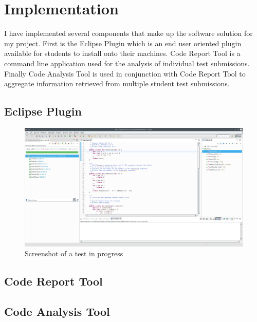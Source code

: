 \documentclass[twocolumn]{article}
\begin{document}
\section{Implementation}

I have implemented several components that make up the software solution for my
project. First is the Eclipse Plugin which is an end user oriented plugin
available for students to install onto their machines. Code Report Tool is a
command line application used for the analysis of individual test submissions.
Finally Code Analysis Tool is used in conjunction with Code Report Tool to
aggregate information retrieved from multiple student test submissions.

\subsection{Eclipse Plugin}

\begin{figure}[h!]
\centering
\includegraphics[width=\linewidth]{figures/eclipse}
\caption{Screenshot of a test in progress}
\end{figure}

\subsection{Code Report Tool}
\subsection{Code Analysis Tool}
\end{document}
